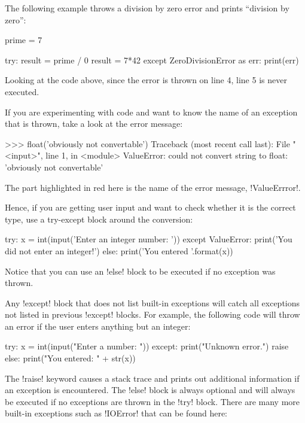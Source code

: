 \documentclass[11pt]{cselabheader}
\begin{document}
The following example throws a division by zero error and prints ``division by
zero'':

\begin{python3code}
prime = 7

try:
    result = prime / 0
    result = 7*42
except ZeroDivisionError as err:
    print(err)
\end{python3code}

Looking at the code above, since the error is thrown on line 4, line 5 is never
executed.

If you are experimenting with code and want to know the name of an exception
that is thrown, take a look at the error message:

\begin{pyconcode}
>>> float('obviously not convertable')
Traceback (most recent call last):
  File "<input>", line 1, in <module>
ValueError: could not convert string to float: 'obviously not convertable'
\end{pyconcode}

The part highlighted in red here is the name of the error message,
\pythoninline!ValueErrror!.

Hence, if you are getting user input and want to check whether it is the correct
type, use a try-except block around the conversion:

\begin{python3code}
try:
    x = int(input('Enter an integer number: '))
except ValueError:
    print('You did not enter an integer!')
else:
    print('You entered {}'.format(x))
\end{python3code}

Notice that you can use an \pythoninline!else! block to be executed if no
exception was thrown.

Any \pythoninline!except!  block that does not list built-in
exceptions will catch all exceptions not listed in previous
\pythoninline!except! blocks.  For example, the following code will throw an
error if the user enters anything but an integer:

\begin{python3code}
try:
    x = int(input("Enter a number: "))
except:
    print("Unknown error.")
    raise
else:
    print("You entered: " + str(x))
\end{python3code}

The \pythoninline!raise! keyword causes a stack trace and prints out additional
information if an exception is encountered.  The \pythoninline!else! block is
always optional and will always be executed if no exceptions are thrown in the
\pythoninline!try! block.  There are many more built-in exceptions such as
\pythoninline!IOError! that can be found here:
\end{document}
